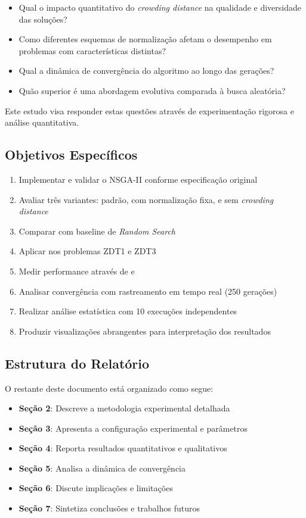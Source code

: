 \begin{itemize}
    \item Qual o impacto quantitativo do \textit{crowding distance} na qualidade e diversidade das soluções?
    \item Como diferentes esquemas de normalização afetam o desempenho em problemas com características distintas?
    \item Qual a dinâmica de convergência do algoritmo ao longo das gerações?
    \item Quão superior é uma abordagem evolutiva comparada à busca aleatória?
\end{itemize}

Este estudo visa responder estas questões através de experimentação rigorosa e análise quantitativa.

\subsection{Objetivos Específicos}

\begin{enumerate}
    \item Implementar e validar o NSGA-II conforme especificação original
    \item Avaliar três variantes: padrão, com normalização fixa, e sem \textit{crowding distance}
    \item Comparar com baseline de \textit{Random Search}
    \item Aplicar nos problemas ZDT1 e ZDT3
    \item Medir performance através de \hlv{} e \spac{}
    \item Analisar convergência com rastreamento em tempo real (250 gerações)
    \item Realizar análise estatística com 10 execuções independentes
    \item Produzir visualizações abrangentes para interpretação dos resultados
\end{enumerate}

\subsection{Estrutura do Relatório}

O restante deste documento está organizado como segue:

\begin{itemize}
    \item \textbf{Seção 2}: Descreve a metodologia experimental detalhada
    \item \textbf{Seção 3}: Apresenta a configuração experimental e parâmetros
    \item \textbf{Seção 4}: Reporta resultados quantitativos e qualitativos
    \item \textbf{Seção 5}: Analisa a dinâmica de convergência
    \item \textbf{Seção 6}: Discute implicações e limitações
    \item \textbf{Seção 7}: Sintetiza conclusões e trabalhos futuros
\end{itemize}
